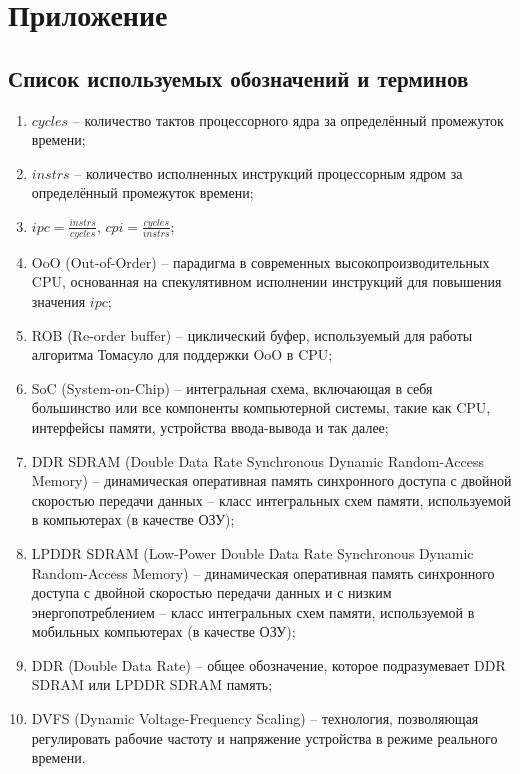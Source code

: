 \section*{Приложение}
\label{sec:Apendix} 

\subsection*{Список используемых обозначений и терминов}

\begin{enumerate}
    \item $cycles$ -- количество тактов процессорного ядра за определённый промежуток времени;
    \item $instrs$ -- количество исполненных инструкций процессорным ядром за определённый
        промежуток времени;
    \item $ipc = \frac{instrs}{cycles}$, $cpi = \frac{cycles}{instrs}$;
    \item OoO (Out-of-Order) -- парадигма в современных высокопроизводительных CPU, основанная
        на спекулятивном исполнении инструкций для повышения значения $ipc$;
    \item ROB (Re-order buffer) -- циклический буфер, используемый для работы алгоритма Томасуло
        для поддержки OoO в CPU;
    \item SoC (System-on-Chip) -- интегральная схема, включающая в себя большинство или все
        компоненты компьютерной системы, такие как CPU, интерфейсы памяти, устройства ввода-вывода
        и так далее;
    \item DDR SDRAM (Double Data Rate Synchronous Dynamic Random-Access Memory) --
        динамическая оперативная память синхронного доступа с двойной скоростью передачи данных --
        класс интегральных схем памяти, используемой в
        компьютерах (в качестве ОЗУ);
    \item LPDDR SDRAM (Low-Power Double Data Rate Synchronous Dynamic Random-Access Memory) --
        динамическая оперативная память синхронного доступа с двойной скоростью передачи данных и
        с низким энергопотреблением -- класс интегральных схем памяти, используемой в
        мобильных компьютерах (в качестве ОЗУ);
    \item DDR (Double Data Rate) -- общее обозначение, которое подразумевает DDR SDRAM или
        LPDDR SDRAM память;
    \item DVFS (Dynamic Voltage-Frequency Scaling) -- технология, позволяющая регулировать
        рабочие частоту и напряжение устройства в режиме реального времени.

\end{enumerate}
